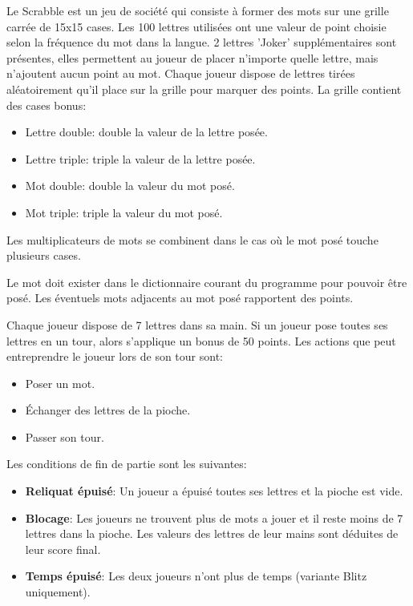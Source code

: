 \documentclass[a4paper,12pt]{article}
\begin{document}
Le Scrabble est un jeu de société qui consiste à former des mots sur
une grille carrée de 15x15 cases.
Les 100 lettres utilisées ont une valeur de point choisie selon la
fréquence du mot dans la langue.
2 lettres 'Joker' supplémentaires sont présentes, elles permettent
au joueur de placer n'importe quelle lettre, mais n'ajoutent aucun
point au mot.
Chaque joueur dispose de lettres tirées aléatoirement qu'il place
sur la grille pour marquer des points.\newline
La grille contient des cases bonus:
\begin{itemize}
  \item Lettre double: double la valeur de la lettre posée.
  \item Lettre triple: triple la valeur de la lettre posée.
  \item Mot double: double la valeur du mot posé.
  \item Mot triple: triple la valeur du mot posé.
\end{itemize}

Les multiplicateurs de mots se combinent dans le cas où le mot posé
touche plusieurs cases.

Le mot doit exister dans le dictionnaire courant du programme pour
pouvoir être posé.
Les éventuels mots adjacents au mot posé rapportent des points.

Chaque joueur dispose de 7 lettres dans sa main.
Si un joueur pose toutes ses lettres en un tour, alors s'applique
un bonus de 50 points.\newline
Les actions que peut entreprendre le joueur lors de son tour sont:
\begin{itemize}
  \item Poser un mot.
  \item Échanger des lettres de la pioche.
  \item Passer son tour.
\end{itemize}

Les conditions de fin de partie sont les suivantes:
\begin{itemize}
  \item \textbf{Reliquat épuisé}: Un joueur a épuisé toutes ses
        lettres et la pioche est vide.
  \item \textbf{Blocage}: Les joueurs ne trouvent plus de mots a
        jouer et il reste moins de 7 lettres dans la pioche.
        Les valeurs des lettres de leur mains sont déduites de leur
        score final.
  \item \textbf{Temps épuisé}: Les deux joueurs n'ont plus de temps
        (variante Blitz uniquement).
\end{itemize}
\end{document}
